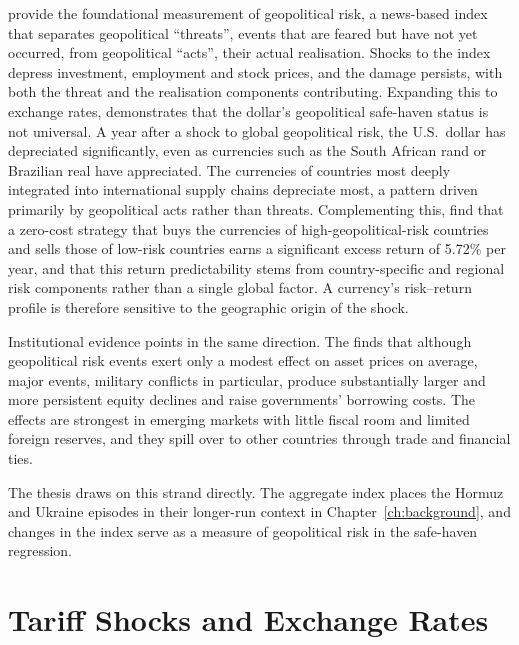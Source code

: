 \textcite{caldara_iacoviello_2022} provide the foundational measurement of
geopolitical risk, a news-based index that separates geopolitical ``threats'',
events that are feared but have not yet occurred, from geopolitical ``acts'', their
actual realisation. Shocks to the index depress investment, employment and stock
prices, and the damage persists, with both the threat and the realisation
components contributing. Expanding this to exchange rates,
\textcite{yilmazkuday_2025} demonstrates that the dollar's geopolitical safe-haven
status is not universal. A year after a shock to global geopolitical risk, the U.S.\ dollar has depreciated significantly, even as currencies such as the South African rand or Brazilian real have appreciated. The currencies of countries most deeply
integrated into international supply chains depreciate most, a pattern driven
primarily by geopolitical acts rather than threats. Complementing this,
\textcite{liu_zhang_2024} find that a zero-cost strategy that buys the currencies
of high-geopolitical-risk countries and sells those of low-risk countries earns a
significant excess return of 5.72\% per year, and that this return predictability
stems from country-specific and regional risk components rather than a single
global factor. A currency's risk--return profile is therefore sensitive to the
geographic origin of the shock.

Institutional evidence points in the same direction. The \textcite{imf_2025_gfsr}
finds that although geopolitical risk events exert only a modest effect on asset
prices on average, major events, military conflicts in particular, produce
substantially larger and more persistent equity declines and raise governments'
borrowing costs. The effects are strongest in emerging markets with little fiscal
room and limited foreign reserves, and they spill over to other countries through
trade and financial ties.

The thesis draws on this strand directly. The aggregate index places the Hormuz and Ukraine episodes in their longer-run context in Chapter~\ref{ch:background}, and changes in the index serve as a measure of geopolitical risk in the safe-haven regression.

\section{Tariff Shocks and Exchange Rates}
\label{sec:lit_tariffs}

